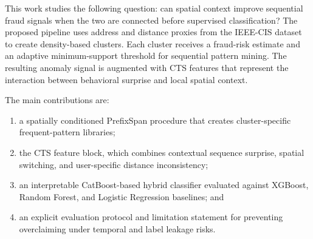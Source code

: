 \documentclass[conference]{IEEEtran}
\begin{document}
This work studies the following question: can spatial context improve sequential fraud signals when the two are connected before supervised classification? The proposed pipeline uses address and distance proxies from the IEEE-CIS dataset to create density-based clusters. Each cluster receives a fraud-risk estimate and an adaptive minimum-support threshold for sequential pattern mining. The resulting anomaly signal is augmented with CTS features that represent the interaction between behavioral surprise and local spatial context.

The main contributions are:
\begin{enumerate}
    \item a spatially conditioned PrefixSpan procedure that creates cluster-specific frequent-pattern libraries;
    \item the CTS feature block, which combines contextual sequence surprise, spatial switching, and user-specific distance inconsistency;
    \item an interpretable CatBoost-based hybrid classifier evaluated against XGBoost, Random Forest, and Logistic Regression baselines; and
    \item an explicit evaluation protocol and limitation statement for preventing overclaiming under temporal and label leakage risks.
\end{enumerate}
\end{document}
